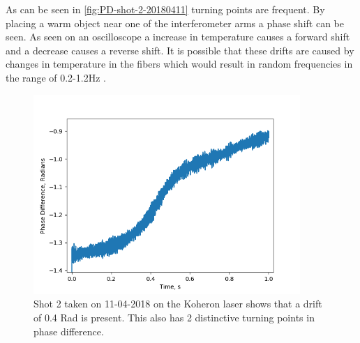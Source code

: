 \documentclass[12pt,a4paper,oneside]{report}
\begin{document}
As can be seen in \autoref{fig:PD-shot-2-20180411} turning points are frequent. By placing a warm object near one of the interferometer arms a phase shift can be seen. As seen on an oscilloscope a increase in temperature causes a forward shift and a decrease causes a reverse shift. It is possible that these drifts are caused by changes in temperature in the fibers which would result in random frequencies in the range of 0.2-1.2Hz \cite{Melikov1997AirRooms}.
\begin{figure}[H] 
\includegraphics[width=0.9\textwidth, center,angle=0]{DImages/Phase_Difference_shot_2_Date_20180411.png}
\caption{Shot 2 taken on 11-04-2018 on the Koheron laser shows that a drift of 0.4 Rad is present. This also has 2 distinctive turning points in phase difference.}
\label{fig:PD-shot-2-20180411}
\end{figure}
\end{document}
